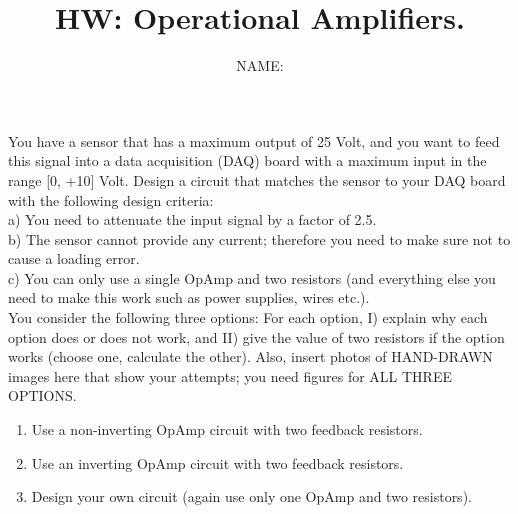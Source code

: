 \documentclass[11pt,letterpaper]{article}
\author{NAME:}
\title{HW: Operational Amplifiers.}
\begin{document}
\maketitle

You have a sensor that has a maximum output of 25 Volt, and you want to feed this signal into a data acquisition (DAQ) board with a maximum input in the range [0, +10] Volt. Design a circuit that matches the sensor to your DAQ board with the following design criteria:\\

a)	You need to attenuate the input signal by a factor of 2.5.\\
b)	The sensor cannot provide any current; therefore you need to make sure not to cause a loading error.\\ 
c)	You can only use a single OpAmp and two resistors (and everything else you need to make this work such as power supplies, wires etc.).\\ 

You consider the following three options: For each option, I) explain why each option does or does not work, and II) give the value of two resistors if the option works (choose one, calculate the other). Also, insert photos of HAND-DRAWN images here that show your attempts; you need figures for ALL THREE OPTIONS.

\begin{enumerate}
	\item Use a non-inverting OpAmp circuit with two feedback resistors. 
	\item Use an inverting OpAmp circuit with two feedback resistors.
	\item Design your own circuit (again use only one OpAmp and two resistors).
\end{enumerate}
\end{document}
